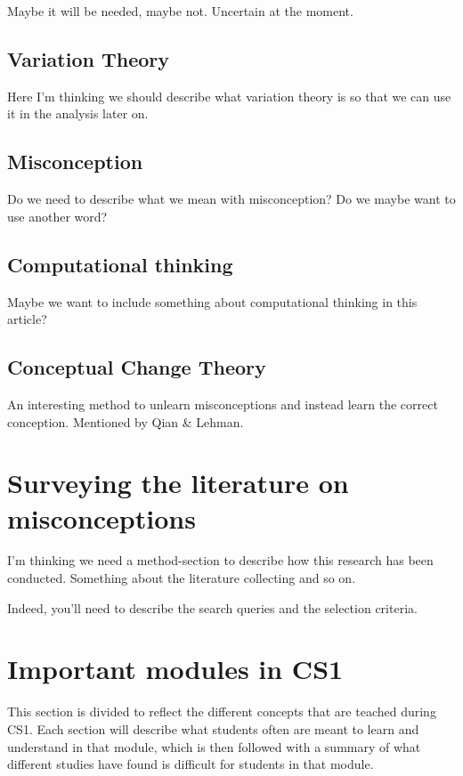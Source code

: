 \documentclass[twocolumn]{article}
\begin{document}
Maybe it will be needed, maybe not. Uncertain at the moment.

\subsection{Variation Theory}

Here I'm thinking we should describe what variation theory is so that we can use it in the analysis later on.

\subsection{Misconception}

Do we need to describe what we mean with misconception? Do we maybe want to use another word? 

\subsection{Computational thinking}

Maybe we want to include something about computational thinking in this article? 

\subsection{Conceptual Change Theory}

An interesting method to unlearn misconceptions and instead learn the correct conception. Mentioned by Qian \& Lehman. 


\section{Surveying the literature on misconceptions}

I'm thinking we need a method-section to describe how this research has been 
conducted. Something about the literature collecting and so on. 

Indeed, you'll need to describe the search queries and the selection criteria.


\section{Important modules in CS1}

This section is divided to reflect the different concepts that are teached during CS1. Each section will describe what students often are meant to learn and understand in that module, which is then followed with a summary of what different studies have found is difficult for students in that module. 
\end{document}
